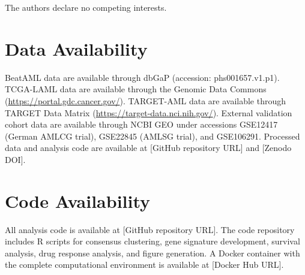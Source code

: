 \documentclass[11pt,a4paper]{article}
\begin{document}
The authors declare no competing interests.

\section*{Data Availability}

BeatAML data are available through dbGaP (accession: phs001657\allowbreak.v1\allowbreak.p1). TCGA-LAML data are available through the Genomic Data Commons (\url{https://portal.gdc.cancer.gov/}). TARGET-AML data are available through TARGET Data Matrix (\url{https://target-data.nci.nih.gov/}). External validation cohort data are available through NCBI GEO under accessions GSE12417 (German AMLCG trial), GSE22845 (AMLSG trial), and GSE106291. Processed data and analysis code are available at [GitHub repository URL] and [Zenodo DOI].

\section*{Code Availability}

All analysis code is available at [GitHub repository URL]. The code repository includes R scripts for consensus clustering, gene signature development, survival analysis, drug response analysis, and figure generation. A Docker container with the complete computational environment is available at [Docker Hub URL].
\end{document}

